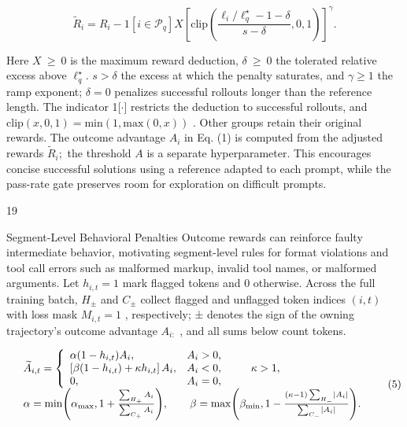 \documentclass[
  10
]{article}
\begin{document}
\[
\widetilde { R } _ { i } = R _ { i } - 1 \left[ i \in \mathcal { P } _ { q } \right] X \left[ \mathrm { c l i p } \left( \frac { \ell _ { i } / \ell _ { q } ^ { \star } - 1 - \delta } { s - \delta } , 0 , 1 \right) \right] ^ { \gamma } .\tag{4}
\]

Here \(X ~ \geq ~ 0\) is the maximum reward deduction,
\(\delta \ \geq \ 0\) the tolerated relative excess above
\(\ell _ { q } ^ { \star } .\) \(s > \delta\) the excess at which the
penalty saturates, and \(\gamma \geq 1\) the ramp exponent;
\(\delta = 0\) penalizes successful rollouts longer than the reference
length. The indicator 1{[}$\cdot${]} restricts the deduction to successful
rollouts, and
\(\mathrm { c l i p } ( x , 0 , 1 ) = \mathrm { m i n } ( 1 , \mathrm { m a x } ( 0 , x ) )\)
. Other groups retain their original rewards. The outcome advantage
\(A _ { i }\) in Eq. (1) is computed from the adjusted rewards
\(\widetilde { R } _ { i } ;\) the threshold $A$ is a separate
hyperparameter. This encourages concise successful solutions using a
reference adapted to each prompt, while the pass-rate gate preserves
room for exploration on difficult prompts.

19

Segment-Level Behavioral Penalties Outcome rewards can reinforce faulty
intermediate behavior, motivating segment-level rules for format
violations and tool call errors such as malformed markup, invalid tool
names, or malformed arguments. Let \(h _ { i , t } = 1\) mark flagged
tokens and 0 otherwise. Across the full training batch, \(H _ { \pm }\)
and \(C _ { \pm }\) collect flagged and unflagged token indices
\(( i , t )\) with loss mask \(M _ { i , t } = 1\) , respectively; ±
denotes the sign of the owning trajectory's outcome advantage
\(A _ { i : }\) , and all sums below count tokens.

\[
\begin{array} { r l } & { \widetilde { A } _ { i , t } = \left\{ \begin{array} { l l } { \alpha ( 1 - h _ { i , t } ) A _ { i } , } & { A _ { i } > 0 , } \\ { \left[ \beta ( 1 - h _ { i , t } ) + \kappa h _ { i , t } \right] A _ { i } , } & { A _ { i } < 0 , } \\ { 0 , } & { A _ { i } = 0 , } \end{array} \right. \qquad \kappa > 1 , } \\ & { \alpha = \operatorname* { m i n } \Biggl ( \alpha _ { \operatorname* { m a x } } , 1 + \frac { \sum _ { H _ { + } } A _ { i } } { \sum _ { C _ { + } } A _ { i } } \Biggr ) , \qquad \beta = \operatorname* { m a x } \Biggl ( \beta _ { \operatorname* { m i n } } , 1 - \frac { \left( \kappa - 1 \right) \sum _ { H _ { - } } \left| A _ { i } \right| } { \sum _ { C _ { - } } \left| A _ { i } \right| } \Biggr ) . } \end{array}\tag{5}
\]
\end{document}
